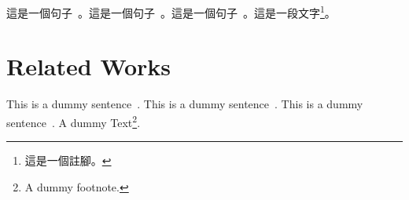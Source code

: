 \documentclass[master]{NTHUthesis}
\begin{document}
    這是一個句子~\cite{Alpher02}。這是一個句子~\cite{Alpher03}。這是一個句子~\cite{Alpher04}。這是一段文字\footnote{這是一個註腳。}。
\else
    \chapter{Related Works}
    
    This is a dummy sentence~\cite{Alpher02}. This is a dummy sentence~\cite{Alpher03}. This is a dummy sentence~\cite{Alpher04}. A dummy Text\footnote{A dummy footnote.}.
\fi



\end{document}

